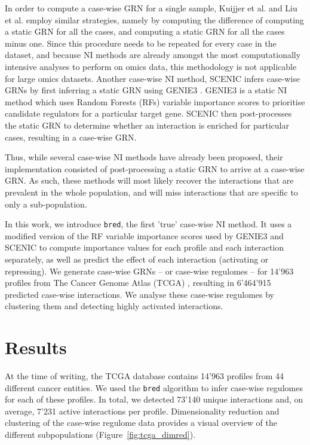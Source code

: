 In order to compute a case-wise GRN for a single sample, Kuijjer et al. \cite{kuijjer_estimatingsamplespecificregulatory_2019} and Liu et al. \cite{liu_personalizedcharacterizationdiseases_2016} employ similar strategies, namely by computing the difference of computing a static GRN for all the cases, and computing a static GRN for all the cases minus one. Since this procedure needs to be repeated for every case in the dataset, and because NI methods are already amongst the most computationally intensive analyses to perform on omics data, this methodology is not applicable for large omics datasets.
Another case-wise NI method, SCENIC \cite{aibar_scenicsinglecellregulatory_2017} infers case-wise GRNs by first inferring a static GRN using GENIE3 \cite{huynh-thu_inferringregulatorynetworks_2010}. GENIE3 is a static NI method which uses Random Forests (RFs) \cite{breiman_randomforests_2001} variable importance scores to prioritise candidate regulators for a particular target gene. SCENIC then post-processes the static GRN to determine whether an interaction is enriched for particular cases, resulting in a case-wise GRN. 

Thus, while several case-wise NI methods have already been proposed, their implementation consisted of post-processing a static GRN to arrive at a case-wise GRN. As such, these methods will most likely recover the interactions that are prevalent in the whole population, and will miss interactions that are specific to only a sub-population.

In this work, we introduce \texttt{bred}, the first 'true' case-wise NI method. It uses a modified version of the RF variable importance scores used by GENIE3 and SCENIC to compute importance values for each profile and each interaction separately, as well as predict the effect of each interaction (activating or repressing). We generate case-wise GRNs -- or case-wise regulomes -- for 14'963 profiles from The Cancer Genome Atlas (TCGA) \cite{weinstein_cancergenomeatlas_2013}, resulting in 6'464'915 predicted case-wise interactions.
We analyse these case-wise regulomes by clustering them and detecting highly activated interactions.

\section{Results}
At the time of writing, the TCGA database contains 14'963 profiles from 44 different cancer entities. We used the \texttt{bred} algorithm to infer case-wise regulomes for each of these profiles. In total, we detected 73'140 unique interactions and, on average, 7'231 active interactions per profile. Dimensionality reduction and clustering of the case-wise regulome data provides a visual overview of the different subpopulations (Figure~\ref{fig:tcga_dimred}).

